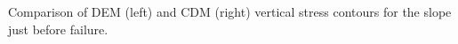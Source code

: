 \label{fig:S22DNS} Comparison of DEM (left) and CDM (right) vertical stress contours for the slope just before failure.